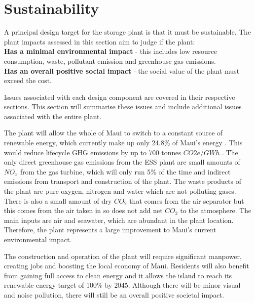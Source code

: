 


%
\section{Sustainability}

A principal design target for the storage plant is that it must be sustainable. The plant impacts assessed in this section aim to judge if the plant:
\\ \textbf{Has a minimal environmental impact} - this includes low resource consumption, waste, pollutant emission and greenhouse gas emissions.
\\ \textbf{Has an overall positive social impact} - the social value of the plant must exceed the cost.

Issues associated with each design component are covered in their respective sections. This section will summarise these issues and include additional issues associated with the entire plant.

The plant will allow the whole of Maui to switch to a constant source of renewable energy, which currently make up only 24.8\% of Maui's energy \cite{website:mauielectric}. This would reduce lifecycle GHG emissions by up to 700 tonnes $CO2e/GWh$ \cite{GHG}. The only direct greenhouse gas emissions from the ESS plant are small amounts of $NO_x$ from the gas turbine, which will only run 5\% of the time and indirect emissions from transport and construction of the plant. The waste products of the plant are pure oxygen, nitrogen and water which are not polluting gases. There is also a small amount of dry $CO_2$ that comes from the air separator but this comes from the air taken in so does not add net $CO_2$ to the atmosphere. The main inputs are air and seawater, which are abundant in the plant location. Therefore, the plant represents a large improvement to Maui's current environmental impact.

The construction and operation of the plant will require significant manpower, creating jobs and boosting the local economy of Maui. Residents will also benefit from gaining full access to clean energy and it allows the island to reach its renewable energy target of 100\% by 2045.\cite{website:hcei} Although there will be minor visual and noise pollution, there will still be an overall positive societal impact.



%